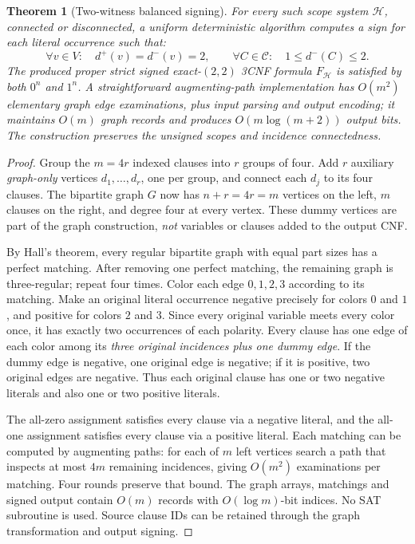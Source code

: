 \documentclass[11pt]{article}
\newtheorem{theorem}{Theorem}
\begin{document}
\begin{theorem}[Two-witness balanced signing]\label{thm:two}
For every such scope system $\mathcal H$, connected or disconnected, a uniform deterministic algorithm computes a sign for each literal occurrence such that:
\[
 \forall v\in V:\quad d^+(v)=d^-(v)=2,\qquad
 \forall C\in\mathcal C:\quad 1\le d^-(C)\le 2.
\]
The produced proper strict signed exact-$(2,2)$ 3CNF formula $F_{\mathcal H}$ is satisfied by both $0^n$ and $1^n$. A straightforward augmenting-path implementation has $O(m^2)$ elementary graph edge examinations, plus input parsing and output encoding; it maintains $O(m)$ graph records and produces $O(m\log(m+2))$ output bits. The construction preserves the unsigned scopes and incidence connectedness.
\end{theorem}
\begin{proof}
Group the $m=4r$ indexed clauses into $r$ groups of four. Add $r$ auxiliary \emph{graph-only} vertices $d_1,\ldots,d_r$, one per group, and connect each $d_j$ to its four clauses. The bipartite graph $G$ now has $n+r=4r=m$ vertices on the left, $m$ clauses on the right, and degree four at every vertex. These dummy vertices are part of the graph construction, \emph{not} variables or clauses added to the output CNF.

By Hall's theorem, every regular bipartite graph with equal part sizes has a perfect matching. After removing one perfect matching, the remaining graph is three-regular; repeat four times. Color each edge $0,1,2,3$ according to its matching. Make an original literal occurrence negative precisely for colors $0$ and $1$, and positive for colors $2$ and $3$. Since every original variable meets every color once, it has exactly two occurrences of each polarity. Every clause has one edge of each color among its \emph{three original incidences plus one dummy edge}. If the dummy edge is negative, one original edge is negative; if it is positive, two original edges are negative. Thus each original clause has one or two negative literals and also one or two positive literals.

The all-zero assignment satisfies every clause via a negative literal, and the all-one assignment satisfies every clause via a positive literal. Each matching can be computed by augmenting paths: for each of $m$ left vertices search a path that inspects at most $4m$ remaining incidences, giving $O(m^2)$ examinations per matching. Four rounds preserve that bound. The graph arrays, matchings and signed output contain $O(m)$ records with $O(\log m)$-bit indices. No SAT subroutine is used. Source clause IDs can be retained through the graph transformation and output signing.\end{proof}
\end{document}
